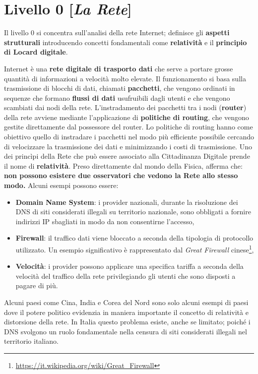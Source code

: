 \chapter{Livello 0 [\emph{La Rete}]}
Il livello 0 si concentra sull'analisi della rete Internet; definisce gli \textbf{aspetti strutturali} introducendo concetti fondamentali come \textbf{relatività} e il \textbf{principio di Locard digitale}.

Internet è una \textbf{rete digitale di trasporto dati} che serve a portare grosse quantità di informazioni a velocità molto elevate. Il funzionamento si basa sulla trasmissione di blocchi di dati, chiamati \textbf{pacchetti}, che vengono ordinati in sequenze che formano \textbf{flussi di dati} usufruibili dagli utenti e che vengono scambiati dai nodi della rete. L'instradamento dei pacchetti tra i nodi (\textbf{router}) della rete avviene mediante l'applicazione di \textbf{politiche di routing}, che vengono gestite direttamente dal possessore del router. Lo politiche di routing hanno come obiettivo quello di instradare i pacchetti nel modo più efficiente possibile cercando di velocizzare la trasmissione dei dati e minimizzando i costi di trasmissione.
\bigbreak
Uno dei princìpi della Rete che può essere associato alla Cittadinanza Digitale prende il nome di \textbf{relatività}. Preso direttamente dal mondo della Fisica, afferma che: \textbf{non possono esistere due osservatori che vedono la Rete allo stesso modo.}
Alcuni esempi possono essere:
\begin{itemize}
    \item \textbf{Domain Name System}: i provider nazionali, durante la risoluzione dei DNS di siti considerati illegali su territorio nazionale, sono obbligati a fornire indirizzi IP sbagliati in modo da non consentirne l'accesso,
    \item \textbf{Firewall}: il traffico dati viene bloccato a seconda della tipologia di protocollo utilizzato. Un esempio significativo è rappresentato dal \emph{Great Firewall} cinese\footnote{\url{https://it.wikipedia.org/wiki/Great_Firewall}},
    \item \textbf{Velocità}: i provider possono applicare una specifica tariffa a seconda della velocità del traffico della rete privilegiando gli utenti che sono disposti a pagare di più.
\end{itemize}
\bigbreak
Alcuni paesi come Cina, India e Corea del Nord sono solo alcuni esempi di paesi dove il potere politico evidenzia in maniera importante il concetto di relatività e distorsione della rete. In Italia questo problema esiste, anche se limitato; poiché i DNS svolgono un ruolo fondamentale nella censura di siti considerati illegali nel territorio italiano.
